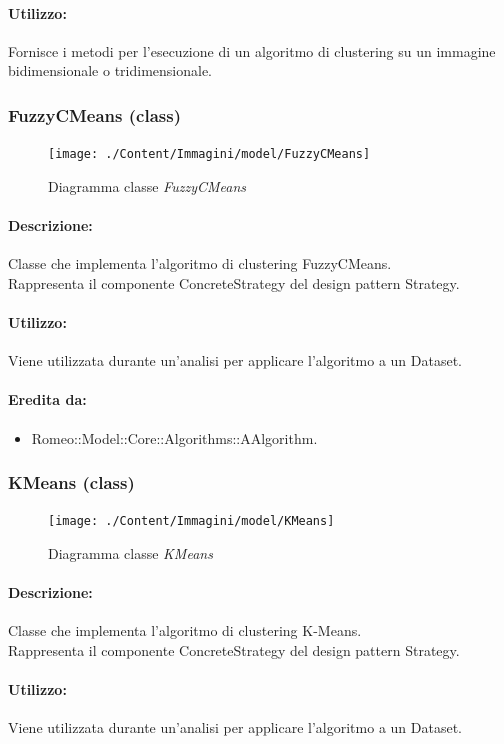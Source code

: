 	\paragraph{Utilizzo:} Fornisce i metodi per l’esecuzione di un algoritmo di clustering\g{} su un immagine bidimensionale o tridimensionale.
	\subsubsection{FuzzyCMeans (class)}
	\begin{figure}[!h]
		\centering
		\texttt{[image: ./Content/Immagini/model/FuzzyCMeans]}
		\caption{Diagramma classe \textsl{FuzzyCMeans}}
	\end{figure}
	\paragraph{Descrizione:} Classe che implementa l’algoritmo di clustering\g{} FuzzyCMeans.
\\Rappresenta il componente ConcreteStrategy del design pattern\g{} Strategy.
	\paragraph{Utilizzo:} Viene utilizzata durante un’analisi per applicare l’algoritmo a un Dataset\g{}.
	\paragraph{Eredita da:}
		\begin{itemize}
			\item Romeo::Model::Core::Algorithms::AAlgorithm.
		\end{itemize}
	\subsubsection{KMeans (class)}
	\begin{figure}[!h]
		\centering
		\texttt{[image: ./Content/Immagini/model/KMeans]}
		\caption{Diagramma classe \textsl{KMeans}}
	\end{figure}
	\paragraph{Descrizione:} Classe che implementa l’algoritmo di clustering\g{} K-Means.
\\Rappresenta il componente ConcreteStrategy del design pattern\g{} Strategy.
	\paragraph{Utilizzo:} Viene utilizzata durante un’analisi per applicare l’algoritmo a un Dataset\g{}.
